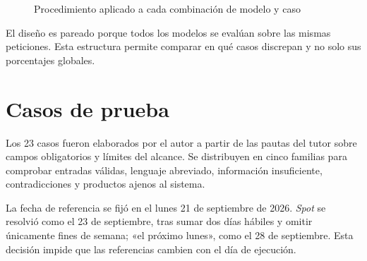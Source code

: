 \begin{figure}[H]
    \centering
    \caption[Procedimiento experimental]{Procedimiento aplicado a cada combinación de modelo y caso}
    \label{fig:procedimiento_experimental}
\end{figure}

El diseño es pareado porque todos los modelos se evalúan sobre las mismas peticiones. Esta estructura permite comparar en qué casos discrepan y no solo sus porcentajes globales.

\section{Casos de prueba}
\label{sec:casos_prueba}

Los 23 casos fueron elaborados por el autor a partir de las pautas del tutor sobre campos obligatorios y límites del alcance. Se distribuyen en cinco familias para comprobar entradas válidas, lenguaje abreviado, información insuficiente, contradicciones y productos ajenos al sistema.

La fecha de referencia se fijó en el lunes 21 de septiembre de 2026. \textit{Spot} se resolvió como el 23 de septiembre, tras sumar dos días hábiles y omitir únicamente fines de semana; «el próximo lunes», como el 28 de septiembre. Esta decisión impide que las referencias cambien con el día de ejecución.

